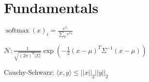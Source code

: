 \section*{Fundamentals}

$\operatorname*{softmax}(x)_i = \frac{e^{x_i}}{\sum_k e^{x_k}}$

$\mathcal{N}:\frac{1}{\sqrt{(2\pi)^d |\Sigma|}}\exp(-\frac{1}{2}(x-\mu)^T\Sigma^{-1} (x-\mu))$

{Cauchy-Schwarz:} $\langle x,y \rangle \leq ||x||_2||y||_2$
